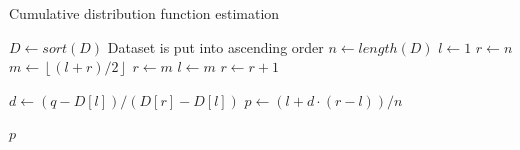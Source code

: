 \documentclass[10pt,final]{siamltex}
\begin{document}
\begin{algorithm}
  \caption{Cumulative distribution function estimation}
  \label{cdf_algo}
  \begin{algorithmic}[1]
    \State $D \gets sort(D)$
    \Comment Dataset is put into ascending order
    \State $n \gets length(D)$
    \State $l \gets 1$
    \State $r \gets n$
    \State $m \gets \left \lfloor{(l+r)/2}\right \rfloor$
    \State $r \gets m$
    \Else
    \State $l \gets m$
    \EndIf
    \EndWhile
    \State $r \gets r + 1$
    \EndWhile

    \State $d \gets (q-D[l])/(D[r]-D[l])$
    \State $p \gets (l + d \cdot (r - l))/n $

    \EndIf

    \State \Return $p$
    \EndFunction
\end{algorithmic}
\end{algorithm}
\end{document}
